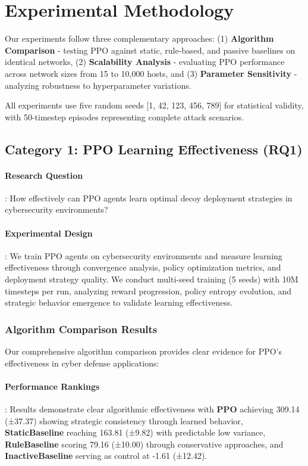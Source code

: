 \documentclass[12pt,oneside]{article}
\begin{document}
\clearpage
\section{Experimental Methodology}

Our experiments follow three complementary approaches: (1) \textbf{Algorithm Comparison} - testing PPO against static, rule-based, and passive baselines on identical networks, (2) \textbf{Scalability Analysis} - evaluating PPO performance across network sizes from 15 to 10,000 hosts, and (3) \textbf{Parameter Sensitivity} - analyzing robustness to hyperparameter variations.

All experiments use five random seeds [1, 42, 123, 456, 789] for statistical validity, with 50-timestep episodes representing complete attack scenarios.

\subsection{Category 1: PPO Learning Effectiveness (RQ1)}

\paragraph{Research Question}: How effectively can PPO agents learn optimal decoy deployment strategies in cybersecurity environments?

\paragraph{Experimental Design}: We train PPO agents on cybersecurity environments and measure learning effectiveness through convergence analysis, policy optimization metrics, and deployment strategy quality. We conduct multi-seed training (5 seeds) with 10M timesteps per run, analyzing reward progression, policy entropy evolution, and strategic behavior emergence to validate learning effectiveness.

\subsubsection{Algorithm Comparison Results}

Our comprehensive algorithm comparison provides clear evidence for PPO's effectiveness in cyber defense applications:

\paragraph{Performance Rankings}: Results demonstrate clear algorithmic effectiveness with \textbf{PPO} achieving 309.14 (±37.37) showing strategic consistency through learned behavior, \textbf{StaticBaseline} reaching 163.81 (±9.82) with predictable low variance, \textbf{RuleBaseline} scoring 79.16 (±10.00) through conservative approaches, and \textbf{InactiveBaseline} serving as control at -1.61 (±12.42).
\end{document}
